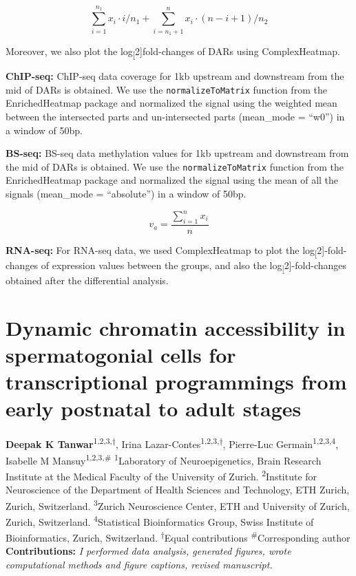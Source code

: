 \documentclass[12pt,twoside]{reedthesis}
\begin{document}
\[
\sum_{i=1}^{n_{1}} x_{i} \cdot i / n_{1}+\sum_{i=n_{1}+1}^{n} x_{i} \cdot(n-i+1) / n_{2}
\]

Moreover, we also plot the log\textsubscript[2{]}fold-changes of DARs using
ComplexHeatmap.

\textbf{ChIP-seq:} ChIP-seq data coverage for 1kb upstream and downstream
from the mid of DARs is obtained. We use the \texttt{normalizeToMatrix} function
from the EnrichedHeatmap package and normalized the signal using the
weighted mean between the intersected parts and un-intersected parts
(mean\_mode = ``w0'') in a window of 50bp.

\textbf{BS-seq:} BS-seq data methylation values for 1kb upstream and
downstream from the mid of DARs is obtained. We use the
\texttt{normalizeToMatrix} function from the EnrichedHeatmap package and
normalized the signal using the mean of all the signals (mean\_mode =
``absolute'') in a window of 50bp.

\[
v_{a}=\frac{\sum_{i=1}^{n} x_{i}}{n}
\]

\textbf{RNA-seq:} For RNA-seq data, we used ComplexHeatmap to plot the
log\textsubscript[2{]}-fold-changes of expression values between the groups, and also the
log\textsubscript[2{]}-fold-changes obtained after the differential analysis.

\hypertarget{chapter1}{%
\chapter{Dynamic chromatin accessibility in spermatogonial cells for transcriptional programmings from early postnatal to adult stages}\label{chapter1}}

\textbf{Deepak K Tanwar}\textsuperscript{1,2,3,$\dagger$}, Irina
Lazar-Contes\textsuperscript{1,2,3,$\dagger$}, Pierre-Luc
Germain\textsuperscript{1,2,3,4}, Isabelle M
Mansuy\textsuperscript{1,2,3,\#}\newline \newline
\textsuperscript{1}Laboratory of Neuroepigenetics, Brain Research
Institute at the Medical Faculty of the University of Zurich. \newline
\textsuperscript{2}Institute for Neuroscience of the Department of
Health Sciences and Technology, ETH Zurich, Zurich, Switzerland.\newline
\textsuperscript{3}Zurich Neuroscience Center, ETH and University of
Zurich, Zurich, Switzerland. \newline \textsuperscript{4}Statistical
Bioinformatics Group, Swiss Institute of Bioinformatics, Zurich,
Switzerland. \newline \newline \textsuperscript{$\dagger$}Equal
contributions \newline\newline \textsuperscript{\#}Corresponding
author \newline\newline 
\textbf{Contributions:} \emph{I performed data analysis, generated figures, wrote computational methods and figure captions, revised manuscript.}
\end{document}
